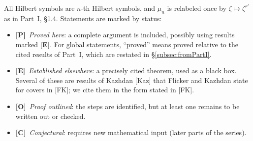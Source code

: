 \documentclass[12pt]{article}
\newcommand{\Pv}{\textbf{[P]}}
\newcommand{\Ev}{\textbf{[E]}}
\newcommand{\Ov}{\textbf{[O]}}
\newcommand{\Cv}{\textbf{[C]}}
\theoremstyle{plain}
\theoremstyle{definition}
\begin{document}
All Hilbert symbols are $n$-th Hilbert symbols, and $\mu_n$ is relabeled once by $\zeta\mapsto\zeta^{r'}$ as in Part~I, \S1.4. Statements are marked by status:
\begin{itemize}
\item \Pv\ \emph{Proved here}: a complete argument is included, possibly using results marked \Ev. For global statements, ``proved'' means proved relative to the cited results of Part~I, which are restated in \S\ref{subsec:fromPartI}.
\item \Ev\ \emph{Established elsewhere}: a precisely cited theorem, used as a black box. Several of these are results of Kazhdan [Kaz] that Flicker and Kazhdan state for covers in [FK]; we cite them in the form stated in [FK].
\item \Ov\ \emph{Proof outlined}: the steps are identified, but at least one remains to be written out or checked.
\item \Cv\ \emph{Conjectural}: requires new mathematical input (later parts of the series).
\end{itemize}
\end{document}

